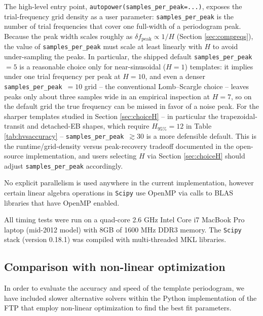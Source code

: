 \documentclass[apj]{emulateapj}
\begin{document}
The high-level entry point, \texttt{autopower(samples\_per\_peak=...)},
exposes the trial-frequency grid density as a user parameter:
\texttt{samples\_per\_peak} is the number of trial frequencies that
cover one full-width of a periodogram peak.  Because the peak width
scales roughly as $\delta f_{\mathrm{peak}}\propto 1/H$
(Section \ref{sec:compreqs}), the value of \texttt{samples\_per\_peak}
must scale at least linearly with $H$ to avoid under-sampling the
peaks.  In particular, the shipped default
\texttt{samples\_per\_peak}~$=5$ is a reasonable choice only for
near-sinusoidal ($H=1$) templates: it implies under one trial
frequency per peak at $H=10$, and even a denser
\texttt{samples\_per\_peak}~$=10$ grid -- the conventional
Lomb--Scargle choice -- leaves peaks only about three samples wide in
an empirical inspection at $H=7$, so on the default grid the true
frequency can be missed in favor of a noise peak.  For the sharper templates studied
in Section \ref{sec:choiceH} -- in particular the trapezoidal-transit
and detached-EB shapes, which require $H_{95\%}=12$ in
Table \ref{tab:hvsaccuracy} -- \texttt{samples\_per\_peak}~$\gtrsim 30$
is a more defensible default.  This is the runtime/grid-density
versus peak-recovery tradeoff documented in the open-source
implementation, and users selecting $H$ via Section \ref{sec:choiceH}
should adjust \texttt{samples\_per\_peak} accordingly.

No explicit parallelism is used anywhere in the current implementation,
however certain linear algebra operations in \texttt{Scipy} use OpenMP
via calls to BLAS libraries that have OpenMP enabled.

All timing tests were run on a quad-core 2.6 GHz Intel Core i7 MacBook
Pro laptop (mid-2012 model) with 8GB of 1600 MHz DDR3 memory. The \texttt{Scipy} stack
(version 0.18.1) was compiled with multi-threaded MKL libraries.

\subsection{Comparison with non-linear optimization}

In order to evaluate the accuracy and speed of the template periodogram,
we have included slower alternative solvers within the Python implementation
of the FTP that employ non-linear optimization to find the best fit parameters.
\end{document}
